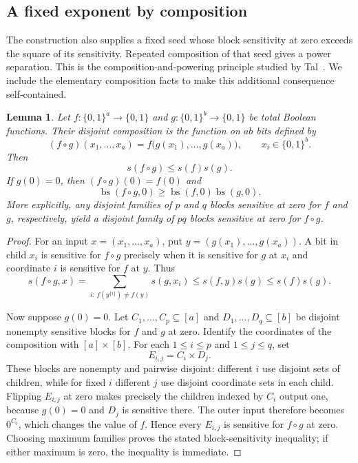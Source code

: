 \documentclass[11pt]{article}
\newcommand{\bs}{\operatorname{bs}}
\newtheorem{lemma}[theorem]{Lemma}
\theoremstyle{definition}
\theoremstyle{remark}
\begin{document}
\subsection{A fixed exponent by composition}

The construction also supplies a fixed seed whose block sensitivity at
zero exceeds the square of its sensitivity. Repeated composition of that
seed gives a power separation. This is the composition-and-powering
principle studied by Tal~\cite{Tal2013}. We include the elementary composition facts
to make this additional consequence self-contained.

\begin{lemma}
\label{lem:composition}
Let $f:\{0,1\}^a\to\{0,1\}$ and
$g:\{0,1\}^b\to\{0,1\}$ be total Boolean functions.
Their disjoint composition is the function on $ab$ bits defined by
\[
 (f\circ g)(x_1,\ldots,x_a)
   =f\bigl(g(x_1),\ldots,g(x_a)\bigr),
 \qquad x_i\in\{0,1\}^b.
\]
Then
\[
 s(f\circ g)\leq s(f)s(g).
\]
If $g(0)=0$, then $(f\circ g)(0)=f(0)$ and
\[
 \bs(f\circ g,0)\geq\bs(f,0)\bs(g,0).
\]
More explicitly, any disjoint families of $p$ and $q$ blocks sensitive at
zero for $f$ and $g$, respectively, yield a disjoint family of $pq$ blocks
sensitive at zero for $f\circ g$.
\end{lemma}

\begin{proof}
For an input $x=(x_1,\ldots,x_a)$, put
$y=(g(x_1),\ldots,g(x_a))$.
A bit in child $x_i$ is sensitive for $f\circ g$ precisely when it is
sensitive for $g$ at $x_i$ and coordinate $i$ is sensitive for $f$ at $y$.
Thus
\[
 s(f\circ g,x)
   =\sum_{i:\,f(y^{\{i\}})\ne f(y)}s(g,x_i)
   \leq s(f,y)s(g)
   \leq s(f)s(g).
\]

Now suppose $g(0)=0$. Let $C_1,\ldots,C_p\subseteq[a]$ and
$D_1,\ldots,D_q\subseteq[b]$ be disjoint nonempty sensitive blocks for
$f$ and $g$ at zero. Identify the coordinates of the composition with
$[a]\times[b]$. For each $1\leq i\leq p$ and $1\leq j\leq q$, set
\[
 E_{i,j}=C_i\times D_j.
\]
These blocks are nonempty and pairwise disjoint: different $i$ use
disjoint sets of children, while for fixed $i$ different $j$ use
disjoint coordinate sets in each child.
Flipping $E_{i,j}$ at zero makes precisely the children indexed by $C_i$
output one, because $g(0)=0$ and $D_j$ is sensitive there.
The outer input therefore becomes $0^{C_i}$, which changes the value of
$f$. Hence every $E_{i,j}$ is sensitive for $f\circ g$ at zero.
Choosing maximum families proves the stated block-sensitivity inequality;
if either maximum is zero, the inequality is immediate.
\end{proof}
\end{document}

